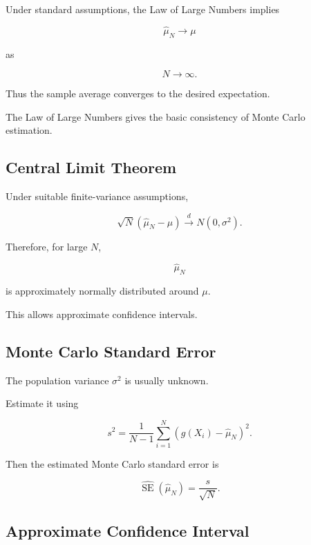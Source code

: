 Under standard assumptions, the Law of Large Numbers implies

\[
\boxed{
\widehat{\mu}_N
\to
\mu
}
\]

as

\[
N\to\infty.
\]

Thus the sample average converges to the desired expectation.

The Law of Large Numbers gives the basic consistency of Monte Carlo
estimation.

\subsection{Central Limit Theorem}
\label{subsec:mc-central-limit-theorem}

Under suitable finite-variance assumptions,

\[
\boxed{
\sqrt{N}
\left(
\widehat{\mu}_N-\mu
\right)
\overset{d}{\longrightarrow}
N(0,\sigma^2).
}
\]

Therefore, for large \(N\),

\[
\widehat{\mu}_N
\]

is approximately normally distributed around \(\mu\).

This allows approximate confidence intervals.

\subsection{Monte Carlo Standard Error}
\label{subsec:mc-standard-error}

The population variance \(\sigma^2\) is usually unknown.

Estimate it using

\[
\boxed{
s^2
=
\frac1{N-1}
\sum_{i=1}^{N}
\left(
g(X_i)-\widehat{\mu}_N
\right)^2.
}
\]

Then the estimated Monte Carlo standard error is

\[
\boxed{
\widehat{\operatorname{SE}}
(
\widehat{\mu}_N
)
=
\frac{s}{\sqrt{N}}.
}
\]

\subsection{Approximate Confidence Interval}
\label{subsec:mc-confidence-interval}

